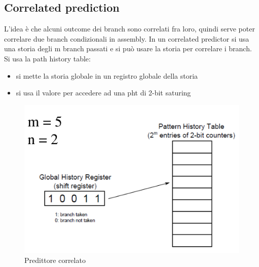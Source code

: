 \documentclass[12pt, oneside]{extbook} %
\begin{document}
\subsection{Correlated prediction}
L'idea è che alcuni outcome dei branch sono correlati fra loro, quindi serve poter correlare due branch condizionali in assembly. In un correlated predictor si usa una storia degli m branch passati e si può usare la storia per correlare i branch. Si usa la path history table:
\begin{itemize}
\item si mette la storia globale in un registro globale della storia
\item si usa il valore per accedere ad una pht di 2-bit saturing 
\end{itemize}
\begin{figure}[!h]
	\includegraphics[scale=0.5]{immagini/corr_pred}
	\caption{Predittore correlato}
\end{figure}
\end{document}
